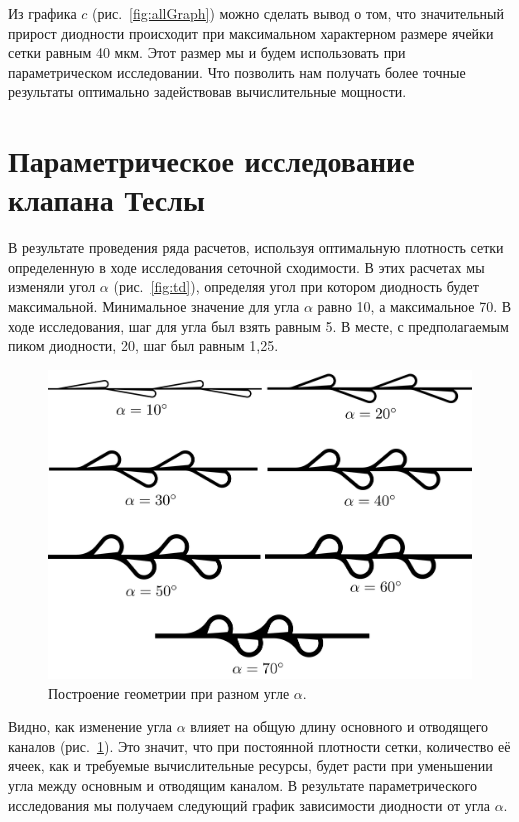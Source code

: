 \documentclass[10pt,a4paper]{book}
\begin{document}
    Из графика $c$ (рис.~\ref{fig:allGraph}) можно сделать вывод о том, что значительный прирост диодности происходит при максимальном характерном размере ячейки сетки равным 40 мкм. Этот размер мы и будем использовать при параметрическом исследовании. Что позволить нам получать более точные результаты оптимально задействовав вычислительные мощности. 

    \section{Параметрическое исследование клапана Теслы}
    В результате проведения ряда расчетов, используя оптимальную плотность сетки определенную в ходе исследования сеточной сходимости. В этих расчетах мы изменяли угол $ \alpha $ (рис.~\ref{fig:td}), определяя угол при котором диодность будет максимальной. Минимальное значение для угла $ \alpha $ равно 10\textdegree, а максимальное 70\textdegree. В ходе исследования, шаг для угла был взять равным 5\textdegree. В месте, с предполагаемым пиком диодности, 20\textdegree, шаг был равным 1,25\textdegree. 
    
    \begin{figure}[H]
        \centering
        \includegraphics[width = 1\linewidth]{allAngle1}
        \caption{Построение геометрии при разном угле $\alpha$.}
        \label{fig:allAngle}
    \end{figure}  
          
    Видно, как изменение угла $\alpha$ влияет на общую длину основного и отводящего каналов (рис.~\ref{fig:allAngle}). Это значит, что при постоянной плотности сетки, количество её ячеек, как и требуемые вычислительные ресурсы, будет расти при уменьшении угла между основным и отводящим каналом. В результате параметрического исследования мы получаем следующий график зависимости диодности от угла $ \alpha $.
  
\end{document}
